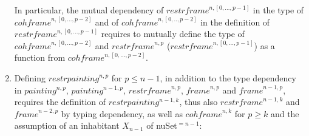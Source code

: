 \documentclass{article}
\newcommand{\myframe}{\mathit{frame}}
\newcommand{\painting}{\mathit{painting}}
\newcommand{\restrframe}{\mathit{restrframe}}
\newcommand{\restrpainting}{\mathit{restrpainting}}
\newcommand{\cohframe}{\mathit{cohframe}}
\begin{document}
\begin{enumerate}
        In particular, the mutual dependency of $\restrframe^{n,[0,...,p-1]}$
        in the type of $\cohframe^{n,[0,...,p-2]}$ and of
        $\cohframe^{n,[0,..,p-2]}$ in the definition of
        $\restrframe^{n,[0,...,p-1]}$ requires to mutually define the type of
        $\cohframe^{n,[0,...,p-2]}$ and $\restrframe^{n,p}$
        ($\restrframe^{n,[0,...,p-1]}$) as a function from
        $\cohframe^{n,[0,...,p-2]}$.

  \item Defining $\restrpainting^{n,p}$ for $p\leq n-1$, in addition to
        the type dependency in $\painting^{n,p}$, $\painting^{n-1,p}$, $\restrframe^{n,p}$, $\myframe^{n,p}$ and
        $\myframe^{n-1,p}$, requires the definition of $\restrpainting^{n-1,k}$,
        thus also $\restrframe^{n-1,k}$ and $\myframe^{n-2,p}$ by typing
        dependency, as well as $\cohframe^{n,k}$ for $p \geq k$ and the
        assumption of an inhabitant $X_{n-1}$ of nuSet$^{=n-1}$:
        \begin{center}
        \end{center}


\end{enumerate}
\end{document}
